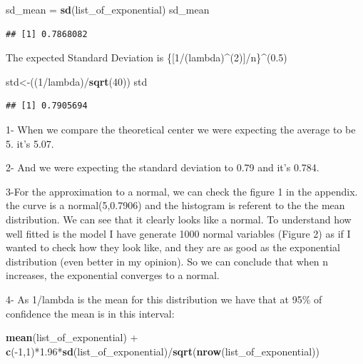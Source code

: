 \documentclass[]{article}
\newenvironment{Shaded}{\begin{snugshade}}{\end{snugshade}}
\newcommand{\KeywordTok}[1]{\textcolor[rgb]{0.13,0.29,0.53}{\textbf{{#1}}}}
\newcommand{\DecValTok}[1]{\textcolor[rgb]{0.00,0.00,0.81}{{#1}}}
\newcommand{\FloatTok}[1]{\textcolor[rgb]{0.00,0.00,0.81}{{#1}}}
\newcommand{\StringTok}[1]{\textcolor[rgb]{0.31,0.60,0.02}{{#1}}}
\newcommand{\NormalTok}[1]{{#1}}
\begin{document}
\begin{Shaded}
\begin{Highlighting}[]
\NormalTok{sd_mean =}\StringTok{ }\KeywordTok{sd}\NormalTok{(list_of_exponential)}
\NormalTok{sd_mean}
\end{Highlighting}
\end{Shaded}

\begin{verbatim}
## [1] 0.7868082
\end{verbatim}

The expected Standard Deviation is
\{{[}1/(lambda)\^{}(2){]}/n\}\^{}(0.5)

\begin{Shaded}
\begin{Highlighting}[]
\NormalTok{std<-((}\DecValTok{1}\NormalTok{/lambda)/}\KeywordTok{sqrt}\NormalTok{(}\DecValTok{40}\NormalTok{))}
\NormalTok{std}
\end{Highlighting}
\end{Shaded}

\begin{verbatim}
## [1] 0.7905694
\end{verbatim}

1- When we compare the theoretical center we were expecting the average
to be 5. it's 5.07.

2- And we were expecting the standard deviation to 0.79 and it's 0.784.

3-For the approximation to a normal, we can check the figure 1 in the
appendix. the curve is a normal(5,0.7906) and the histogram is referent
to the the mean distribution. We can see that it clearly looks like a
normal. To understand how well fitted is the model I have generate 1000
normal variables (Figure 2) as if I wanted to check how they look like,
and they are as good as the exponential distribution (even better in my
opinion). So we can conclude that when n increases, the exponential
converges to a normal.

4- As 1/lambda is the mean for this distribution we have that at 95\% of
confidence the mean is in this interval:

\begin{Shaded}
\begin{Highlighting}[]
\KeywordTok{mean}\NormalTok{(list_of_exponential) +}\StringTok{ }\KeywordTok{c}\NormalTok{(-}\DecValTok{1}\NormalTok{,}\DecValTok{1}\NormalTok{)*}\FloatTok{1.96}\NormalTok{*}\KeywordTok{sd}\NormalTok{(list_of_exponential)/}\KeywordTok{sqrt}\NormalTok{(}\KeywordTok{nrow}\NormalTok{(list_of_exponential))}
\end{Highlighting}
\end{Shaded}
\end{document}
